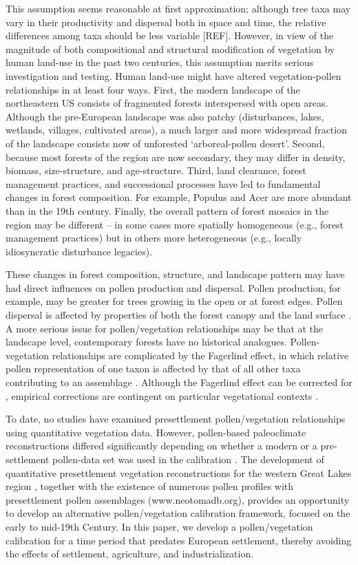 \documentclass[12pt]{article}
\begin{document}
This assumption seems reasonable at first approximation; although tree
taxa may vary in their productivity and dispersal both in space and
time, the relative differences among taxa should be less variable
[REF].  However, in view of the magnitude of both compositional and
structural modification of vegetation by human land-use in the past
two centuries, this assumption merits serious investigation and
testing.  Human land-use might have altered vegetation-pollen
relationships in at least four ways.  First, the modern landscape of
the northeastern US consists of fragmented forests interspersed with
open areas.  Although the pre-European landscape was also patchy
(disturbances, lakes, wetlands, villages, cultivated areas), a much
larger and more widespread fraction of the landscape consists now of
unforested ‘arboreal-pollen desert’.  Second, because most forests of
the region are now secondary, they may differ in density, biomass,
size-structure, and age-structure.  Third, land clearance, forest
management practices, and successional processes have led to
fundamental changes in forest composition.  For example, Populus and
Acer are more abundant than in the 19th century.  Finally, the overall
pattern of forest mosaics in the region may be different – in some
cases more spatially homogeneous (e.g., forest management practices)
but in others more heterogeneous (e.g., locally idiosyncratic
disturbance legacies).

These changes in forest composition, structure, and landscape pattern
may have had direct influences on pollen production and dispersal.
Pollen production, for example, may be greater for trees growing in
the open or at forest edges.  Pollen dispersal is affected by
properties of both the forest canopy and the land surface
\citep{jackson1999pollen}.  A more serious issue for pollen/vegetation
relationships may be that at the landscape level, contemporary forests
have no historical analogues.  Pollen-vegetation relationships are
complicated by the Fagerlind effect, in which relative pollen
representation of one taxon is affected by that of all other taxa
contributing to an assemblage \citep{prentice1988records}.  Although
the Fagerlind effect can be corrected for \citep{prentice1986,
  jackson1995exploration}, empirical corrections are contingent on
particular vegetational contexts \citep{jackson1998quantitative}.

To date, no studies have examined presettlement pollen/vegetation
relationships using quantitative vegetation data.  However,
pollen-based paleoclimate reconstructions differed significantly
depending on whether a modern or a pre-settlement pollen-data set was
used in the calibration \citep{st2014bias}.  The development of
quantitative presettlement vegetation reconstructions for the western
Great Lakes region \citep{goring2015b}, together with the existence
of numerous pollen profiles with presettlement pollen assemblages
(www.neotomadb.org), provides an opportunity to develop an alternative
pollen/vegetation calibration framework, focused on the early to
mid-19th Century.  In this paper, we develop a pollen/vegetation
calibration for a time period that predates European settlement,
thereby avoiding the effects of settlement, agriculture, and
industrialization.
\end{document}
